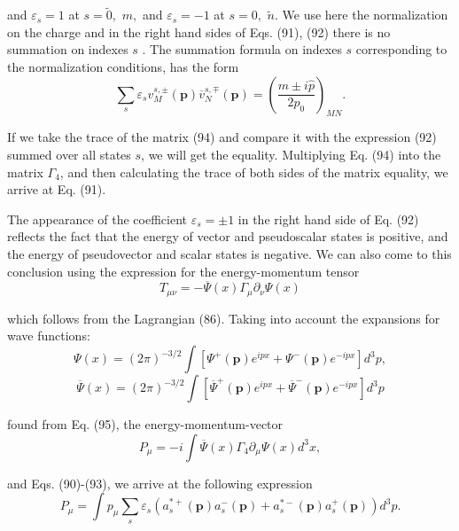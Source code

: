 \documentclass[a4paper,12pt]{article}
\begin{document}
and $\varepsilon _s=1$ at $s=\widetilde{0},$ $m,$ and $\varepsilon
_s=-1$ at $s=0,$ $\widetilde{n}.$ We use here the normalization on
the charge and in the right hand sides of Eqs. (91), (92) there is
no summation on indexes $s$ . The summation formula on indexes $s$
corresponding to the normalization conditions, has the form
\begin{equation}
\sum_s\varepsilon _sv_M^{s,\pm }(\mathbf{p})\overline{v}_N^{s,\mp
}(\mathbf{p })=\left( \frac{m\pm i\widehat{p}}{2p_0}\right) _{MN}
. \label{94}
\end{equation}

If we take the trace of the matrix (94) and compare it with the expression
(92) summed over all states $s$, we will get the equality. Multiplying Eq.
(94) into the matrix $\Gamma _4$, and then calculating the trace of both
sides of the matrix equality, we arrive at Eq. (91).

The appearance of the coefficient $\varepsilon _s=\pm 1$ in the right hand
side of Eq. (92) reflects the fact that the energy of vector and
pseudoscalar states is positive, and the energy of pseudovector and scalar
states is negative. We can also come to this conclusion using the expression
for the energy-momentum tensor
\begin{equation}
T_{\mu \nu }=-\overline{\Psi }(x)\Gamma _\mu \partial _\nu \Psi (x)
\label{95}
\end{equation}

which follows from the Lagrangian (86). Taking into account the expansions
for wave functions:
\[
\Psi (x)=(2\pi )^{-3/2}\int \left[ \Psi
^{+}(\mathbf{p})e^{ipx}+\Psi ^{-}( \mathbf{p})e^{-ipx}\right] d^3p
,
\]
\vspace{-8mm}
\begin{equation}
\label{96}
\end{equation}
\vspace{-8mm}
\[
\overline{\Psi }(x)=(2\pi )^{-3/2}\int \left[ \overline{\Psi
}^{+}(\mathbf{p} )e^{ipx}+\overline{\Psi
}^{-}(\mathbf{p})e^{-ipx}\right] d^3p
\]

found from Eq. (95), the energy-momentum-vector
\begin{equation}
P_\mu =-i\int \overline{\Psi }(x)\Gamma _4\partial _\mu \Psi
(x)d^3x ,\label{97}
\end{equation}

and Eqs. (90)-(93), we arrive at the following expression
\begin{equation}
P_\mu =\int p_\mu \sum_s\varepsilon _s\left(
a_s^{*+}(\mathbf{p})a_s^{-}(
\mathbf{p})+a_s^{*-}(\mathbf{p})a_s^{+}(\mathbf{p})\right) d^3p .
\label{98}
\end{equation}
\end{document}
